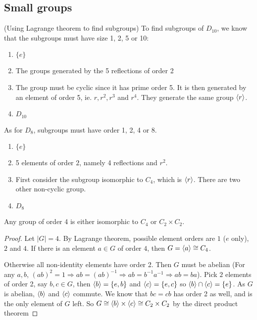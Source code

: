 \documentclass[a4paper]{article}
\begin{document}
  \subsection{Small groups}
  \begin{eg}
    (Using Lagrange theorem to find subgroups) To find subgroups of $D_{10}$, we know that the subgroups must have size 1, 2, 5 or 10:
    \begin{enumerate}[label=\arabic{*}:]
      \item $\{e\}$
      \item The groups generated by the 5 reflections of order 2
        \setcounter{enumi}{4}
      \item The group must be cyclic since it has prime order 5. It is then generated by an element of order 5, ie. $r, r^2, r^3$ and $r^4$. They generate the same group $\langle r\rangle$.
        \setcounter{enumi}{9}
      \item $D_{10}$
    \end{enumerate}

    As for $D_8$, subgroups must have order 1, 2, 4 or 8.
    \begin{enumerate}[label=\arabic{*}:]
      \item $\{e\}$
      \item 5 elements of order $2$, namely 4 reflections and $r^2$.
        \setcounter{enumi}{3}
      \item First consider the subgroup isomorphic to $C_4$, which is $\langle r\rangle$. There are two other non-cyclic group.
        \setcounter{enumi}{7}
      \item $D_8$
    \end{enumerate}
  \end{eg}

  \begin{prop}
    Any group of order 4 is either isomorphic to $C_4$ or $C_2\times C_2$.
  \end{prop}

  \begin{proof}
    Let $|G| = 4$. By Lagrange theorem, possible element orders are $1$ ($e$ only), $2$ and $4$. If there is an element $a\in G$ of order $4$, then $G = \langle a\rangle \cong C_4$.

    Otherwise all non-identity elements have order 2. Then $G$ must be abelian (For any $a, b$, $(ab)^2 = 1 \Rightarrow ab = (ab)^{-1} \Rightarrow ab = b^{-1}a^{-1} \Rightarrow ab = ba$).
    Pick $2$ elements  of order 2, say $b, c\in G$, then $\langle b\rangle=\{e, b\}$ and $\langle c\rangle = \{e, c\}$ so $\langle b\rangle\cap \langle c\rangle = \{e\}$. As $G$ is abelian, $\langle b\rangle$ and $\langle c\rangle$ commute. We know that $bc = cb$ has order 2 as well, and is the only element of $G$ left. So $G \cong \langle b\rangle\times \langle c\rangle \cong C_2\times C_2$ by the direct product theorem
  \end{proof}
\end{document}

